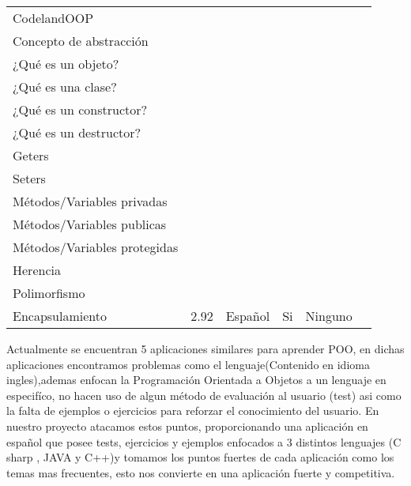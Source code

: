 \begin{longtable}[c]{|l|l|l|l|l|l|}
CodelandOOP & \begin{tabular}[c]{@{}l@{}}Concepto de Poo\\ Concepto de abstracción\\ ¿Qué es un objeto?\\ ¿Qué es una clase?\\ ¿Qué es un constructor?\\ ¿Qué es un destructor?\\ Geters \\ Seters \\ Métodos/Variables privadas\\ Métodos/Variables publicas\\ Métodos/Variables protegidas\\ Herencia\\ Polimorfismo\\ Encapsulamiento\end{tabular} & 2.92 & Español & Si & Ninguno \\ \hline
\end{longtable}

Actualmente se encuentran 5 aplicaciones similares para aprender POO, en dichas aplicaciones encontramos problemas como el lenguaje(Contenido en idioma ingles),ademas enfocan la Programación Orientada a Objetos a un lenguaje en especifíco, no hacen uso de algun método de evaluación al usuario (test) asi como la falta de ejemplos o ejercicios para reforzar el conocimiento del usuario.
En nuestro proyecto atacamos estos puntos, proporcionando una aplicación en español que posee tests, ejercicios y ejemplos enfocados a 3 distintos lenguajes (C sharp , JAVA y C++)y tomamos los puntos fuertes de cada aplicación como los temas mas frecuentes, esto nos convierte en una aplicación fuerte y competitiva.